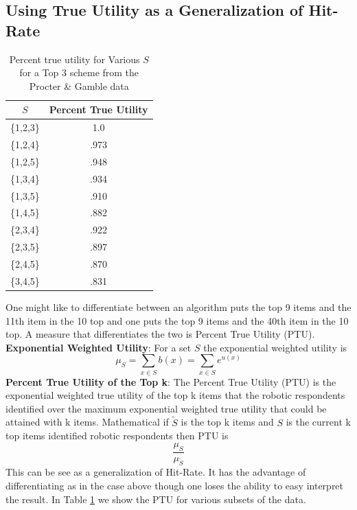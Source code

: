 \documentclass[nonblindrev]{informs3}
\begin{document}
\subsection{Using True Utility as a Generalization of Hit-Rate}
\begin{table}
\begin{center}
\begin{tabular}{c | c }
$S$& Percent True Utility \\
\hline
\{1,2,3\}& 1.0 \\
\{1,2,4\}&.973 \\
\{1,2,5\}&.948 \\
\{1,3,4\}&.934 \\
\{1,3,5\}&.910 \\
\{1,4,5\}&.882 \\
\{2,3,4\}&.922 \\
\{2,3,5\}&.897 \\
\{2,4,5\}&.870 \\
\{3,4,5\}&.831 \\
\hline
\end{tabular}
\end{center}
\caption{Percent true utility for Various $S$ for a Top 3 scheme from the Procter \& Gamble data}
\label{table:PTU}
\end{table}
One might like to differentiate between an algorithm puts the top 9 items and the 11th item in the 10 top and one puts the top 9 items and the 40th item in the 10 top. A measure that differentiates the two is Percent True Utility (PTU). \\
\textbf{Exponential Weighted Utility}: For a set $S$ the exponential weighted utility is \[\mu_S=\sum_{x \in S}b(x)=\sum_{x \in S}e^{u(x)}\]
\textbf{Percent True Utility of the Top k}: The Percent True Utility (PTU) is the exponential weighted true utility of the top k items that the robotic respondents identified over the maximum exponential weighted true utility that could be attained with k items. Mathematical if $\tilde{S}$ is the top k items and $S$ is the current k top items identified robotic respondents then PTU is 
\[
\frac{\mu_S}{\mu_{\tilde{S}}}
\]
This can be see as a generalization of Hit-Rate. It has the advantage of differentiating as in the case above though one loses the ability to easy interpret the result. In Table \ref{table:PTU} we show the PTU for various subsets of the data.
\end{document}
